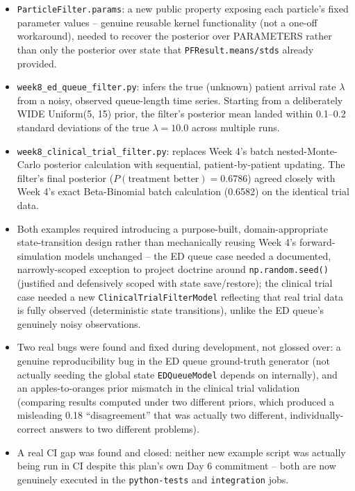 \documentclass[11pt]{article}
\begin{document}
\begin{itemize}[leftmargin=*]
  \item \texttt{ParticleFilter.params}: a new public property exposing
    each particle's fixed parameter values -- genuine reusable kernel
    functionality (not a one-off workaround), needed to recover the
    posterior over PARAMETERS rather than only the posterior over
    state that \texttt{PFResult.means/stds} already provided.
  \item \texttt{week8\_ed\_queue\_filter.py}: infers the true (unknown)
    patient arrival rate $\lambda$ from a noisy, observed queue-length
    time series. Starting from a deliberately WIDE
    Uniform(5, 15) prior, the filter's posterior mean landed within
    0.1--0.2 standard deviations of the true $\lambda=10.0$ across
    multiple runs.
  \item \texttt{week8\_clinical\_trial\_filter.py}: replaces Week 4's
    batch nested-Monte-Carlo posterior calculation with sequential,
    patient-by-patient updating. The filter's final posterior
    ($P(\text{treatment better}) = 0.6786$) agreed closely with Week
    4's exact Beta-Binomial batch calculation (0.6582) on the
    identical trial data.
  \item Both examples required introducing a purpose-built,
    domain-appropriate state-transition design rather than
    mechanically reusing Week 4's forward-simulation models unchanged
    -- the ED queue case needed a documented, narrowly-scoped
    exception to project doctrine around \texttt{np.random.seed()}
    (justified and defensively scoped with state save/restore); the
    clinical trial case needed a new
    \texttt{ClinicalTrialFilterModel} reflecting that real trial data
    is fully observed (deterministic state transitions), unlike the
    ED queue's genuinely noisy observations.
  \item Two real bugs were found and fixed during development, not
    glossed over: a genuine reproducibility bug in the ED queue
    ground-truth generator (not actually seeding the global state
    \texttt{EDQueueModel} depends on internally), and an
    apples-to-oranges prior mismatch in the clinical trial validation
    (comparing results computed under two different priors, which
    produced a misleading 0.18 ``disagreement'' that was actually two
    different, individually-correct answers to two different
    problems).
  \item A real CI gap was found and closed: neither new example
    script was actually being run in CI despite this plan's own Day 6
    commitment -- both are now genuinely executed in the
    \texttt{python-tests} and \texttt{integration} jobs.
\end{itemize}
\end{document}
